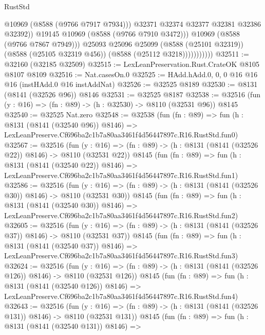 \begin{lexlean}{RustStd}
\begin{coremodule}
                                @10969
                                (@8588 (@9766 @7917 @7934)))
                              @32371
                              @32374
                              @32377
                              @32381
                              @32386
                              @32392))
                          @19145
                          @10969
                          (@8588 (@9766 @7910 @3472)))
                        @10969
                        (@8588 (@9766 @7867 @7949)))
                      @25093
                      @25096
                      @25099
                      (@8588 (@25101 @32319))
                      (@8588 (@25105 @32319 @456))
                      (@8588 (@25112 @3218)))))))))))
@32511 := @32160 (@32185 @32509)
@32515 := LexLeanPreservation.Rust.CrateOK @8105 @8107 @8109
@32516 := Nat.casesOn.{0}
@32525 := HAdd.hAdd.{0, 0, 0} @16 @16 @16 (instHAdd.{0} @16 instAddNat)
@32526 := @32525 @8189
@32530 := @8131 (@8141 (@32526 @96)) @8146
@32531 := @32525 @8187
@32538 := @32516 (fun (y : @16) => (fn : @89) -> (h : @32530) -> @8110 (@32531 @96)) @8145
@32540 := @32525 Nat.zero
@32548 := @32538
    (fun (fn : @89) =>
    fun (h : @8131 (@8141 (@32540 @96)) @8146) =>
    LexLeanPreserve.Cf696ba2c1b7a80aa3461f4d56447897c.R16.RustStd.fun0)
@32567 := @32516
    (fun (y : @16) => (fn : @89) -> (h : @8131 (@8141 (@32526 @22)) @8146) -> @8110 (@32531 @22))
    @8145
    (fun (fn : @89) =>
    fun (h : @8131 (@8141 (@32540 @22)) @8146) =>
    LexLeanPreserve.Cf696ba2c1b7a80aa3461f4d56447897c.R16.RustStd.fun1)
@32586 := @32516
    (fun (y : @16) => (fn : @89) -> (h : @8131 (@8141 (@32526 @30)) @8146) -> @8110 (@32531 @30))
    @8145
    (fun (fn : @89) =>
    fun (h : @8131 (@8141 (@32540 @30)) @8146) =>
    LexLeanPreserve.Cf696ba2c1b7a80aa3461f4d56447897c.R16.RustStd.fun2)
@32605 := @32516
    (fun (y : @16) => (fn : @89) -> (h : @8131 (@8141 (@32526 @37)) @8146) -> @8110 (@32531 @37))
    @8145
    (fun (fn : @89) =>
    fun (h : @8131 (@8141 (@32540 @37)) @8146) =>
    LexLeanPreserve.Cf696ba2c1b7a80aa3461f4d56447897c.R16.RustStd.fun3)
@32624 := @32516
    (fun (y : @16) => (fn : @89) -> (h : @8131 (@8141 (@32526 @126)) @8146) -> @8110 (@32531 @126))
    @8145
    (fun (fn : @89) =>
    fun (h : @8131 (@8141 (@32540 @126)) @8146) =>
    LexLeanPreserve.Cf696ba2c1b7a80aa3461f4d56447897c.R16.RustStd.fun4)
@32643 := @32516
    (fun (y : @16) => (fn : @89) -> (h : @8131 (@8141 (@32526 @131)) @8146) -> @8110 (@32531 @131))
    @8145
    (fun (fn : @89) =>
    fun (h : @8131 (@8141 (@32540 @131)) @8146) =>

\end{coremodule}
\end{lexlean}
